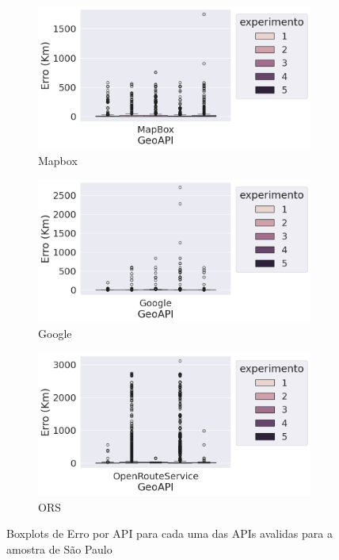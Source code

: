 \begin{figure}[ht]
  \centering
  \begin{subfigure}[b]{0.45\textwidth}
    \includegraphics[width=\textwidth]{Figuras/boxplotApiMapboxSP.png}
    \caption{Mapbox}
    \label{fig:boxplot-api-mapbox-sp}
  \end{subfigure}
  \hfill
  \begin{subfigure}[b]{0.45\textwidth}
    \includegraphics[width=\textwidth]{Figuras/boxplotApiGoogleSP.png}
    \caption{Google}
    \label{fig:boxplot-api-google-sp}
  \end{subfigure}
  
  \begin{subfigure}[b]{0.45\textwidth}
    \includegraphics[width=\textwidth]{Figuras/boxplotApiOrsSP.png}
    \caption{ORS}
    \label{fig:boxplot-api-ors-sp}
  \end{subfigure}
  
  \caption{Boxplots de Erro por API para cada uma das APIs avalidas para a amostra de São Paulo}
  \label{fig:boxplot-api-global-sp}
\end{figure}

